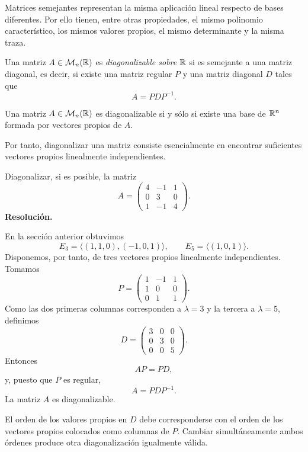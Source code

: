 Matrices semejantes representan la misma aplicación lineal respecto de bases diferentes. Por ello tienen, entre otras propiedades, el mismo polinomio característico, los mismos valores propios, el mismo determinante y la misma traza.

\begin{definition}
Una matriz $A\in\mathcal M_n(\mathbb{R})$ es \emph{diagonalizable sobre $\mathbb{R}$} si es semejante a una matriz diagonal, es decir, si existe una matriz regular $P$ y una matriz diagonal $D$ tales que
\[
A=PDP^{-1}.
\]
\end{definition}

\begin{theorem}
Una matriz $A\in\mathcal M_n(\mathbb{R})$ es diagonalizable si y sólo si existe una base de $\mathbb{R}^n$ formada por vectores propios de $A$.
\end{theorem}

Por tanto, diagonalizar una matriz consiste esencialmente en encontrar suficientes vectores propios linealmente independientes.

\begin{solvedexercise}
Diagonalizar, si es posible, la matriz
\[
A=\begin{pmatrix}
4&-1&1\\
0&3&0\\
1&-1&4
\end{pmatrix}.
\]
\tcblower
\textbf{Resolución.}\par\smallskip
En la sección anterior obtuvimos
\[
E_3=\langle(1,1,0),(-1,0,1)\rangle,
\qquad
E_5=\langle(1,0,1)\rangle.
\]
Disponemos, por tanto, de tres vectores propios linealmente independientes. Tomamos
\[
P=\begin{pmatrix}
1&-1&1\\
1&0&0\\
0&1&1
\end{pmatrix}.
\]
Como las dos primeras columnas corresponden a $\lambda=3$ y la tercera a $\lambda=5$, definimos
\[
D=\begin{pmatrix}
3&0&0\\
0&3&0\\
0&0&5
\end{pmatrix}.
\]
Entonces
\[
AP=PD,
\]
y, puesto que $P$ es regular,
\[
\boxed{A=PDP^{-1}.}
\]
La matriz $A$ es diagonalizable.
\end{solvedexercise}

El orden de los valores propios en $D$ debe corresponderse con el orden de los vectores propios colocados como columnas de $P$. Cambiar simultáneamente ambos órdenes produce otra diagonalización igualmente válida.

